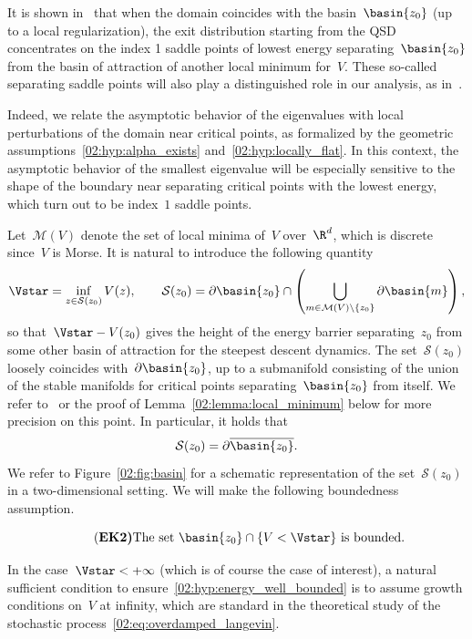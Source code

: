     It is shown in~\cite{DGLLPN19,LLPN22} that when the domain coincides with the basin~$\basin{z_0}$ (up to a local regularization), the exit distribution starting from the QSD concentrates on the index 1 saddle points of lowest energy separating~$\basin{z_0}$ from the basin of attraction of another local minimum for~$V$. These so-called separating saddle points will also play a distinguished role in our analysis, as in~\cite{HS85,HKN04,BGK05,LPN21,LLPN22}.

    Indeed, we relate the asymptotic behavior of the eigenvalues with local perturbations of the domain near critical points, as formalized by the geometric assumptions~\eqref{02:hyp:alpha_exists} and~\eqref{02:hyp:locally_flat}.
    In this context, the asymptotic behavior of the smallest eigenvalue will be especially sensitive to the shape of the boundary near separating critical points with the lowest energy, which turn out to be index~$1$ saddle points.

    Let~$\mathcal M(V)$ denote the set of local minima of~$V$ over~$\R^d$, which is discrete since~$V$ is Morse.
    It is natural to introduce the following quantity
    \begin{equation}
        \label{02:eq:vstar}
        \Vstar = \underset{z\in \mathcal S(z_0)}{\inf}\, V(z),\qquad \mathcal S(z_0)=\partial \basin{z_0}\cap \left(\bigcup_{m\in\mathcal M(V)\setminus \{z_0\}} \partial\basin{m}\right),
    \end{equation}
    so that~$\Vstar-V(z_0)$ gives the height of the energy barrier separating~$z_0$ from some other basin of attraction for the steepest descent dynamics.
    The set~$\mathcal S(z_0)$ loosely coincides with~$\partial\basin{z_0}$, up to a submanifold consisting of the union of the stable manifolds for critical points separating~$\basin{z_0}$ from itself. We refer to~\cite[Theorem B.13]{MS14} or the proof of Lemma~\ref{02:lemma:local_minimum} below for more precision on this point.
    In particular, it holds that
    \begin{equation}
    \label{02:eq:s_alt_rep}
    \mathcal S(z_0) = \partial{\overline{\basin{z_0}}}.
    \end{equation}
    We refer to Figure~\ref{02:fig:basin} for a schematic representation of the set~$\mathcal S(z_0)$ in a two-dimensional setting.
    We will make the following boundedness assumption.
    \begin{hypothesis}
        \begin{equation}
            \tag{\bf EK2}
            \label{02:hyp:energy_well_bounded}
            \text{The set }\basin{z_0}\cap \{V<\Vstar\}\text{ is bounded.}
        \end{equation}
    \end{hypothesis}
    In the case~$\Vstar<+\infty$ (which is of course the case of interest), a natural sufficient condition to ensure~\eqref{02:hyp:energy_well_bounded} is to assume growth conditions on~$V$ at infinity, which are standard in the theoretical study of the stochastic process~\eqref{02:eq:overdamped_langevin}.

